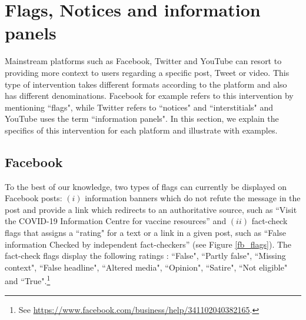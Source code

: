 \documentclass{article}
\begin{document}

\section{Flags, Notices and information panels} \label{flags}

Mainstream platforms such as Facebook, Twitter and YouTube can resort to providing more context to users regarding a specific post, Tweet or video. This type of intervention takes different formats according to the platform and also has different denominations. Facebook for example refers to this intervention by mentioning ``flags", while Twitter  refers to ``notices" and ``interstitials" and YouTube uses the term ``information panels". In this section, we explain the specifics of this intervention for each platform and illustrate with examples. 

\subsection{Facebook}

To the best of our knowledge, two types of flags can currently be displayed on Facebook posts: 
$(i)$ information banners which do not refute the message in the post and provide a link which redirects to an authoritative source, such as ``Visit the COVID-19 Information Centre for vaccine resources'' and $(ii)$ fact-check flags that assigns a ``rating" for a text or a link in a given post, such as ``False information Checked by independent fact-checkers'' (see Figure \ref{fb_flags}). The fact-check flags display the following ratings : ``False", ``Partly false", ``Missing context", ``False headline", ``Altered media", ``Opinion", ``Satire", ``Not eligible" and ``True".\footnote{See \href{https://www.facebook.com/business/help/341102040382165}{https://www.facebook.com/business/help/341102040382165}.}
\end{document}
